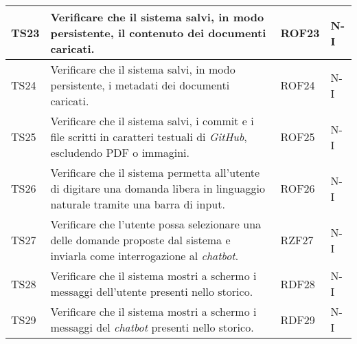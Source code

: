 \begin{table}[h!]
\begin{tabularx}{\textwidth}{|p{}|X|p{}|p{}|}
    TS23 & Verificare che il sistema salvi, in modo persistente, il contenuto dei documenti caricati. & ROF23 & N-I \\ \hline
    TS24 & Verificare che il sistema salvi, in modo persistente, i metadati dei documenti caricati. & ROF24 & N-I \\ \hline
    TS25 & Verificare che il sistema salvi, i commit e i file scritti in caratteri testuali di \emph{GitHub}, escludendo PDF o immagini. & ROF25 & N-I \\ \hline
    TS26 & Verificare che il sistema permetta all’utente di digitare una domanda libera in linguaggio naturale tramite una barra di input. & ROF26 & N-I \\ \hline
    TS27 & Verificare che l'utente possa selezionare una delle domande proposte dal sistema e inviarla come interrogazione al \emph{chatbot}. & RZF27 & N-I \\ \hline
    TS28 & Verificare che il sistema mostri a schermo i messaggi dell’utente presenti nello storico. & RDF28 & N-I \\ \hline
    TS29 & Verificare che il sistema mostri a schermo i messaggi del \emph{chatbot} presenti nello storico. & RDF29 & N-I \\ \hline

    \end{tabularx}
\end{table}

\newpage

